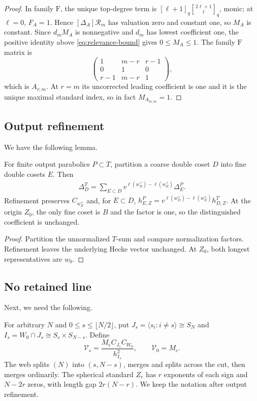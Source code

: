 \documentclass[a4paper,11pt]{amsart}
\numberwithin{equation}{subsection}
\theoremstyle{plain}
\theoremstyle{definition}
\theoremstyle{remark}
\newcommand{\qbinom}[2]{\genfrac{[}{]}{0pt}{}{#1}{#2}}
\begin{document}
\begin{proof}
In family $\mathrm F$, the unique top-degree term is
$[\ell+1]_q\qbinom{2\ell+1}{\ell}_q$, monic; at $\ell=0$, $F_A=1$.
Hence $[\Delta_A]\mathcal R_m$ has valuation zero and constant
one, so $M_A$ is constant. Since $d_mM_A$ is nonnegative and
$d_m$ has lowest coefficient one, the positive identity above
\autoref{eq:relevance-bound} gives $0\le M_A\le1$.
The family $\mathrm F$ matrix is
\[
\begin{pmatrix}1&m-r&r-1\\0&1&0\\r-1&m-r&1\end{pmatrix},
\]
which is $A_{r;m}$.  At $r=m$ its uncorrected leading coefficient is one and
it is the unique maximal standard index, so in fact $M_{A_{m;m}}=1$.
\end{proof}

\subsection{Output refinement}

We have the following lemma.

\begin{lemma}\label{lem:output-refinement}
For finite output parabolics $P\subset T$, partition a coarse double coset
$D$ into fine double cosets $E$. Then
\begin{gather}\label{eq:parabolic-refinement}
\Delta_D^T=\sum_{E\subset D}
v^{\ell(w_D^+)-\ell(w_E^+)}\Delta_E^P.
\end{gather}
Refinement preserves $C_{w_Z^+}$ and, for $E\subset D$,
$h^P_{E,Z}=v^{\ell(w_D^+)-\ell(w_E^+)}h^T_{D,Z}$.
At the origin $Z_0$, the only fine coset is $B$ and the factor is one,
so the distinguished coefficient is unchanged.
\end{lemma}

\begin{proof}
Partition the unnormalized $T$-sum and compare normalization
factors. Refinement leaves the underlying Hecke vector unchanged.
At $Z_0$, both longest representatives are $w_0$.
\end{proof}

\subsection{No retained line}\label{sec:full-spherical-gallery}

Next, we need the following.

\begin{definition}\label{def:spherical-web}
For arbitrary $N$ and $0\le s\le\lfloor N/2\rfloor$, put
$J_s=\langle s_i:i\ne s\rangle\cong S_N$ and
$I_s=W_0\cap J_s\cong S_s\times S_{N-s}$. Define
\[
\mathcal V_s=\frac{M_eC_{J_s}C_{W_0}}{h_{I_s}^2},\qquad
\mathcal V_0=M_e.
\]
The web splits $(N)$ into $(s,N-s)$, merges and splits across
the cut, then merges ordinarily. The spherical standard $Z_r$
has $r$ exponents of each sign and $N-2r$ zeros, with length gap
$2r(N-r)$. We keep the notation after output refinement.
\end{definition}
\end{document}
